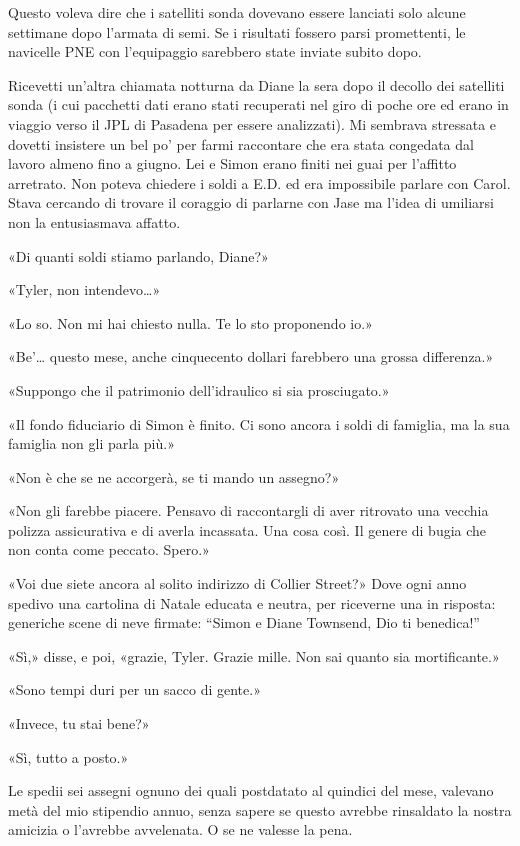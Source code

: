 Questo voleva dire che i satelliti sonda dovevano essere lanciati solo
alcune settimane dopo l'armata di semi. Se i risultati fossero parsi
promettenti, le navicelle PNE con l'equipaggio sarebbero state inviate
subito dopo.

Ricevetti un'altra chiamata notturna da Diane la sera dopo il decollo
dei satelliti sonda (i cui pacchetti dati erano stati recuperati nel
giro di poche ore ed erano in viaggio verso il JPL di Pasadena per
essere analizzati). Mi sembrava stressata e dovetti insistere un bel po'
per farmi raccontare che era stata congedata dal lavoro almeno fino a
giugno. Lei e Simon erano finiti nei guai per l'affitto arretrato. Non
poteva chiedere i soldi a E.D. ed era impossibile parlare con Carol.
Stava cercando di trovare il coraggio di parlarne con Jase ma l'idea di
umiliarsi non la entusiasmava affatto.

«Di quanti soldi stiamo parlando, Diane?»

«Tyler, non intendevo\ldots»

«Lo so. Non mi hai chiesto nulla. Te lo sto proponendo io.»

«Be'\ldots{} questo mese, anche cinquecento dollari farebbero una grossa
differenza.»

«Suppongo che il patrimonio dell'idraulico si sia prosciugato.»

«Il fondo fiduciario di Simon è finito. Ci sono ancora i soldi di
famiglia, ma la sua famiglia non gli parla più.»

«Non è che se ne accorgerà, se ti mando un assegno?»

«Non gli farebbe piacere. Pensavo di raccontargli di aver ritrovato una
vecchia polizza assicurativa e di averla incassata. Una cosa così. Il
genere di bugia che non conta come peccato. Spero.»

«Voi due siete ancora al solito indirizzo di Collier Street?» Dove ogni
anno spedivo una cartolina di Natale educata e neutra, per riceverne una
in risposta: generiche scene di neve firmate: ``Simon e Diane Townsend,
Dio ti benedica!''

«Sì,» disse, e poi, «grazie, Tyler. Grazie mille. Non sai quanto sia
mortificante.»

«Sono tempi duri per un sacco di gente.»

«Invece, tu stai bene?»

«Sì, tutto a posto.»

Le spedii sei assegni ognuno dei quali postdatato al quindici del mese,
valevano metà del mio stipendio annuo, senza sapere se questo avrebbe
rinsaldato la nostra amicizia o l'avrebbe avvelenata. O se ne valesse la
pena.

